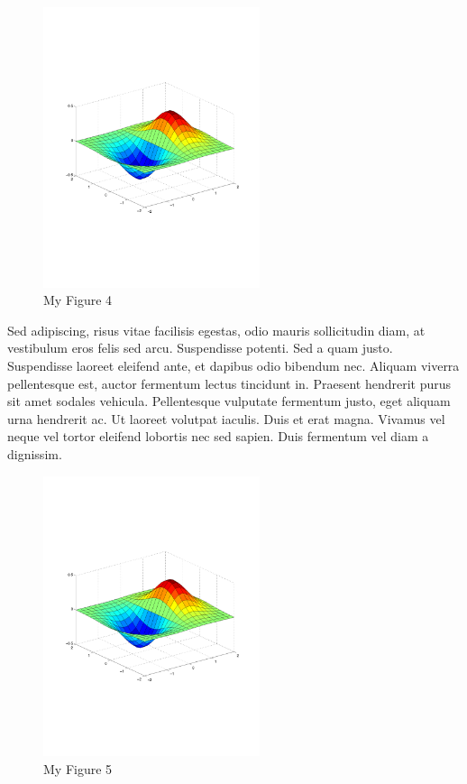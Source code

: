 \begin{figure}[h!]
	\begin{center}
		\includegraphics[width=2.5in]{./images/sample.pdf}
		\caption{My Figure 4}
		\label{fig:MyFigure4}
	\end{center}
\end{figure}

Sed adipiscing, risus vitae facilisis egestas, odio mauris sollicitudin diam, at vestibulum eros felis sed arcu. Suspendisse potenti. Sed a quam justo. Suspendisse laoreet eleifend ante, et dapibus odio bibendum nec. Aliquam viverra pellentesque est, auctor fermentum lectus tincidunt in. Praesent hendrerit purus sit amet sodales vehicula. Pellentesque vulputate fermentum justo, eget aliquam urna hendrerit ac. Ut laoreet volutpat iaculis. Duis et erat magna. Vivamus vel neque vel tortor eleifend lobortis nec sed sapien. Duis fermentum vel diam a dignissim. 

\begin{figure}[h!]
	\begin{center}
		\includegraphics[width=2.5in]{./images/sample.pdf}
		\caption{My Figure 5}
		\label{fig:MyFigure5}
	\end{center}
\end{figure}


